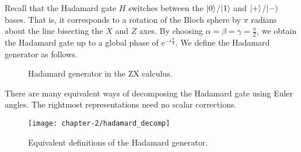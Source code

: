 Recall that the Hadamard gate $H$ switches between the $\ket 0$/$\ket 1$ and $\ket +$/$\ket -$ bases. That is, it corresponds to a rotation of the Bloch sphere by $\pi$ radians about the line bisecting the $X$ and $Z$ axes. By choosing $\alpha = \beta = \gamma = \frac{\pi}{2}$, we obtain the Hadamard gate up to a global phase of $e^{-i\frac{\pi}{4}}$. We define the Hadamard generator as follows.

\begin{figure}[H]
    \caption{Hadamard generator in the ZX calculus.}
\end{figure}

There are many equivalent ways of decomposing the Hadamard gate using Euler angles. The rightmost representations need no scalar corrections.
\begin{figure}[H]
\centering
    \centering
    \texttt{[image: chapter-2/hadamard\_decomp]}
    \caption{Equivalent definitions of the Hadamard generator.}
\end{figure}
